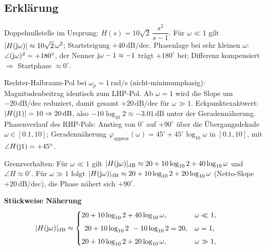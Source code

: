 \subsection{Erklärung}
\vspace{5mm}
\begin{description}[leftmargin=1.2em,labelsep=.6em,font=\bfseries]
\item[Schritt 1] Doppelnullstelle im Ursprung: $H(s)=10\sqrt{2}\,\dfrac{s^2}{s-1}$. Für $\omega\ll1$ gilt $|H(\operatorname{j}\!\omega)|\approx 10\sqrt{2}\,\omega^{2}$; Startsteigung $+40\,\mathrm{dB/dec}$. Phasenlage bei sehr kleinen $\omega$: $\angle(\operatorname{j}\!\omega)^2=+180^\circ$, der Nenner $\operatorname{j}\!\omega-1\approx-1$ trägt $+180^\circ$ bei; Differenz kompensiert $\Rightarrow$ Startphase $\approx0^\circ$.
\item[Schritt 2] Rechter-Halbraum-Pol bei $\omega_p=1\,\mathrm{rad/s}$ (nicht-minimumphasig): Magnitudenbeitrag identisch zum LHP-Pol. Ab $\omega=1$ wird die Slope um $-20\,\mathrm{dB/dec}$ reduziert, damit gesamt $+20\,\mathrm{dB/dec}$ für $\omega\gg1$. Eckpunktexaktwert: $|H(\operatorname{j}\!1)|=10\Rightarrow 20\,\mathrm{dB}$, also $-10\log_{10}2\approx-3.01\,\mathrm{dB}$ unter der Geradennäherung. Phasenverlauf des RHP-Pols: Anstieg von $0^\circ$ auf $+90^\circ$ über die Übergangsdekade $\omega\in[0.1,10]$; Geradennäherung $\varphi_{\text{approx}}(\omega)=45^\circ+45^\circ\log_{10}\omega$ in $[0.1,10]$, mit $\angle H(\operatorname{j}\!1)=+45^\circ$.
\item[Schritt 3] Grenzverhalten: Für $\omega\ll1$ gilt $|H(\operatorname{j}\!\omega)|_{\mathrm{dB}}\approx 20+10\log_{10}2+40\log_{10}\omega$ und $\angle H\approx0^\circ$. Für $\omega\gg1$ folgt $|H(\operatorname{j}\!\omega)|_{\mathrm{dB}}\approx 20+10\log_{10}2+20\log_{10}\omega$ (Netto-Slope $+20\,\mathrm{dB/dec}$), die Phase nähert sich $+90^\circ$.
\end{description}

\vspace{0.5cm}
\medskip
\noindent\textbf{Stückweise Näherung}
\[
|H(\operatorname{j}\!\omega)|_{\mathrm{dB}}\approx
\begin{cases}
20+10\log_{10}2+40\log_{10}\omega,& \omega\ll1,\\[4pt]
\left.\;20+10\log_{10}2\;\right.-10\log_{10}2=20,& \omega=1,\\[4pt]
20+10\log_{10}2+20\log_{10}\omega,& \omega\gg1,
\end{cases}
\qquad
\]
\newpage